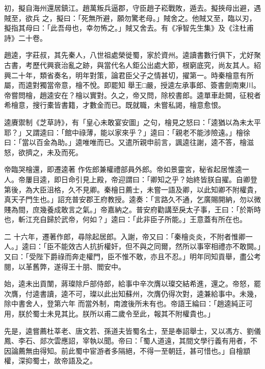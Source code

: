 \begin{pinyinscope}
 初，擬自海州還居鎮江。趙萬叛兵逼郡，守臣趙子崧戰敗，遁去。擬挾母出避，遇賊至，欲兵
 之，擬曰：「死無所避，願勿驚老母。」賊舍之。他賊又至，臨以刃，擬指其母曰：「此吾母也，幸勿怖之。」賊又舍去。有《凈智先生集》及《注杜甫詩》二十卷。



 趙逵，字莊叔，其先秦人，八世祖處榮徙蜀，家於資州。逵讀書數行俱下，尤好聚古書，考歷代興衰治亂之跡，與當代名人鉅公出處大節，根窮底究，尚友其人。紹興二十年，類省奏名，明年對策，論君臣父子之情甚切，擢第一。時秦檜意有所屬，而逵對獨當帝意，檜不悅。即罷知
 舉王□嚴，授逵左承事郎、簽書劍南東川。帝嘗問檜，趙逵安在？檜以實對。久之，帝又問，除校書郎。逵單車赴闕，征稅者希檜意，搜行橐皆書籍，才數金而已。既就職，未嘗私謁，檜意愈恨。



 逵賡禦制《芝草詩》，有「皇心未敢宴安圖」之句，檜見之怒曰：「逵猶以為未太平耶？」又謂逵曰：「館中祿薄，能以家來乎？」逵曰：「親老不能涉險遠。」檜徐曰：「當以百金為助。」逵唯唯而已。又遣所親申前言，諷逵往謝，逵不答，檜滋怒，欲擠之，未及而死。



 帝臨哭檜還，即遷逵著
 作佐郎兼權禮部員外郎。帝如景靈宮，秘省起居惟逵一人。帝屢目逵，即日命引見上殿，帝迎謂曰：「卿知之乎？始終皆朕自擢。自卿登第後，為大臣沮格，久不見卿。秦檜日薦士，未嘗一語及卿，以此知卿不附權貴，真天子門生也。」詔充普安郡王府教授。逵奏：「言路久不通，乞廣賜開納，勿以微賤為間，庶幾養成敢言之氣。」帝嘉納之。普安府勸講至戾太子事，王曰：「於斯時也，斬江充自歸於武帝，何如？」逵曰：「此非臣子所能。」王意蓋有所在也。



 二
 十六年，遷著作郎，尋除起居郎。入謝，帝又曰：「秦檜炎炎，不附者惟卿一人。」逵曰：「臣不能效古人抗折權奸，但不與之同爾，然所以事宰相禮亦不敢闕。」又曰：「受陛下爵祿而奔走權門，臣不惟不敢，亦且不忍。」明年同知貢舉，盡公考閱，以革舊弊，遂得王十朋、閻安中。



 始，逵未出貢闈，蔣璨除戶部侍郎，給事中辛次膺以璨交結希進，還之。帝怒，罷次膺，付逵書讀，逵不可，璨以此出知蘇州，次膺仍得次對，逵兼給事中。未幾，除中書舍人，登第六年
 而當外制，南渡後所未有也。帝語王綸曰：「趙逵純正可用，朕於蜀士未見其比。朕所以甫二歲令至此，報其不附權貴也。」



 先是，逵嘗薦杜莘老、唐文若、孫道夫皆蜀名士，至是奉詔舉士，又以馮方、劉儀鳳、李石、郯次雲應詔，宰執以聞。帝曰：「蜀人道遠，其間文學行義有用者，不因論薦無由得知。前此蜀中宦游者多隔絕，不得一至朝廷，甚可惜也。」自檜顓權，深抑蜀士，故帝語及之。




\end{pinyinscope}
